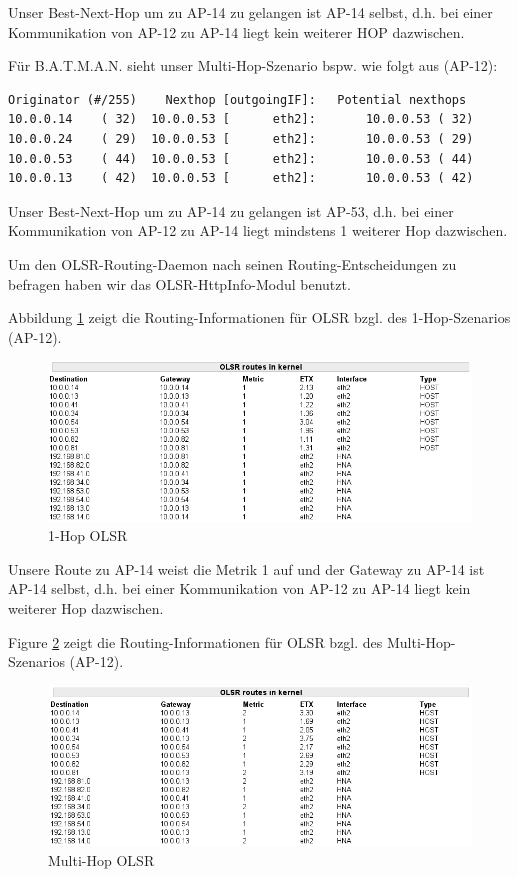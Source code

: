 \documentclass[a4paper,10pt]{article}
\begin{document}
Unser Best-Next-Hop um zu AP-14 zu gelangen ist AP-14 selbst, d.h. bei einer Kommunikation von AP-12 zu AP-14 liegt kein weiterer HOP dazwischen.

Für B.A.T.M.A.N. sieht unser Multi-Hop-Szenario bspw. wie folgt aus (AP-12):

\begin{lstlisting}
Originator (#/255)    Nexthop [outgoingIF]:   Potential nexthops
10.0.0.14    ( 32)  10.0.0.53 [      eth2]:       10.0.0.53 ( 32)
10.0.0.24    ( 29)  10.0.0.53 [      eth2]:       10.0.0.53 ( 29)
10.0.0.53    ( 44)  10.0.0.53 [      eth2]:       10.0.0.53 ( 44)
10.0.0.13    ( 42)  10.0.0.53 [      eth2]:       10.0.0.53 ( 42)
\end{lstlisting}

Unser Best-Next-Hop um zu AP-14 zu gelangen ist AP-53, d.h. bei einer Kommunikation von AP-12 zu AP-14 liegt mindstens 1 weiterer Hop dazwischen.

Um den OLSR-Routing-Daemon nach seinen Routing-Entscheidungen zu befragen haben wir das OLSR-HttpInfo-Modul benutzt.

Abbildung \ref{1hop_olsr} zeigt die Routing-Informationen für OLSR bzgl. des 1-Hop-Szenarios (AP-12).

\begin{center}
  \begin{figure}[thb]
    \includegraphics[width=1\textwidth]{1hop_olsr.png}
    \caption{1-Hop OLSR}
    \label{1hop_olsr}
  \end{figure}
\end{center}

Unsere Route zu AP-14 weist die Metrik 1 auf und der Gateway zu AP-14 ist AP-14 selbst, d.h. bei einer Kommunikation von AP-12 zu AP-14 liegt kein weiterer Hop dazwischen.

Figure \ref{2hop_olsr} zeigt die Routing-Informationen für OLSR bzgl. des Multi-Hop-Szenarios (AP-12).

\begin{center}
  \begin{figure}[thb]
    \includegraphics[width=1\textwidth]{2hop_olsr.png}
    \caption{Multi-Hop OLSR}
    \label{2hop_olsr}
  \end{figure}
\end{center}
\end{document}

